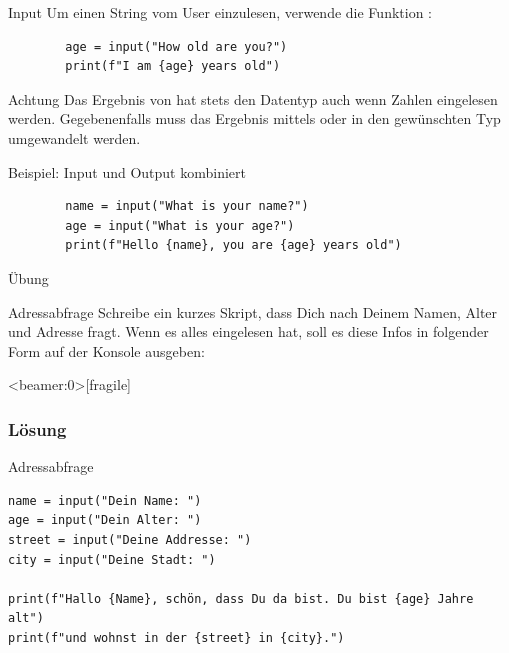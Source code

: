 \begin{fragile}
	\begin{block}{Input}
		\vspace{2pt}
		Um einen String vom User einzulesen, verwende die Funktion :
		
		\begin{verbatim}
		age = input("How old are you?")
		print(f"I am {age} years old")
		\end{verbatim}
	\end{block}
	\pause 
	\begin{alertblock}{Achtung}
		\vspace{2pt}
		Das Ergebnis von  hat stets den Datentyp  auch wenn Zahlen eingelesen werden. Gegebenenfalls muss das Ergebnis mittels  oder  in den gewünschten Typ umgewandelt werden. 	
	\end{alertblock}
	
\end{fragile}


\begin{fragile}[]
	\begin{exampleblock}{Beispiel: Input und Output kombiniert}
		\begin{verbatim}
		name = input("What is your name?")
		age = input("What is your age?")
		print(f"Hello {name}, you are {age} years old") 
		\end{verbatim}
	\end{exampleblock}
\end{fragile}

\begin{frame}{Übung}
\begin{block}{Adressabfrage}
\vspace{2pt}
Schreibe ein kurzes Skript, dass Dich nach Deinem Namen, Alter und Adresse fragt. Wenn es alles eingelesen hat, soll es diese Infos in folgender Form auf der Konsole ausgeben: 	

\end{block}
\end{frame}

\begin{frame}<beamer:0>[fragile]
\frametitle{Lösung}
\begin{solutionblock}{Adressabfrage}
\begin{verbatim}
name = input("Dein Name: ")
age = input("Dein Alter: ")
street = input("Deine Addresse: ")
city = input("Deine Stadt: ") 

print(f"Hallo {Name}, schön, dass Du da bist. Du bist {age} Jahre alt")
print(f"und wohnst in der {street} in {city}.")
\end{verbatim}
\end{solutionblock}
\end{frame}




